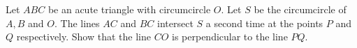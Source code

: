 Let $ABC$ be an acute triangle with circumcircle $O$. Let $S$ be the circumcircle of $A,B$ and $O$.
The lines $AC$ and $BC$ intersect $S$ a second time at the points $P$ and $Q$ respectively.
Show that the line $CO$ is perpendicular to the line $PQ$.